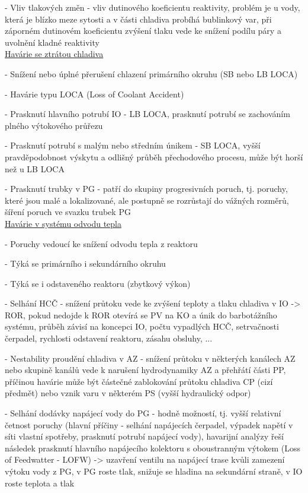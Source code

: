 \noindent - 	Vliv tlakových změn - vliv dutinového koeficientu reaktivity, problém je u vody, která je blízko meze sytosti a v části chladiva probíhá bublinkový var, při záporném dutinovém koeficientu zvýšení tlaku vede ke snížení podílu páry a uvolnění kladné reaktivity
\\

\underline{Havárie se ztrátou chladiva}

\noindent - 	Snížení nebo úplné přerušení chlazení primárního okruhu (SB nebo LB LOCA)

\noindent - 	Havárie typu LOCA (Loss of Coolant Accident)

\noindent - 	Prasknutí hlavního potrubí IO - LB LOCA, prasknutí potrubí se zachováním plného výtokového průřezu

\noindent - 	Prasknutí potrubí s malým nebo středním únikem - SB LOCA, vyšší pravděpodobnost výskytu a odlišný průběh přechodového procesu, může být horší než u LB LOCA

\noindent - 	Prasknutí trubky v PG - patří do skupiny progresivních poruch, tj. poruchy, které jsou malé a lokalizované, ale postupně se rozrůstají do vážných rozměrů, šíření poruch ve svazku trubek PG
\\

\underline{Havárie v systému odvodu tepla}

\noindent - 	Poruchy vedoucí ke snížení odvodu tepla z reaktoru

\noindent - 	Týká se primárního i sekundárního okruhu

\noindent - 	Týká se i odstaveného reaktoru (zbytkový výkon)

\noindent - 	Selhání HCČ - snížení průtoku vede ke zvýšení teploty a tlaku chladiva v IO -> ROR, pokud nedojde k ROR otevírá se PV na KO a únik do barbotážního systému, průběh závisí na koncepci IO, počtu vypadlých HCČ, setrvačnosti čerpadel, rychlosti odstavení reaktoru, zásahu obsluhy, ...

\noindent - 	Nestability proudění chladiva v AZ - snížení průtoku v některých kanálech AZ nebo skupině kanálů vede k narušení hydrodynamiky AZ a přehřátí části PP, příčinou havárie může být částečné zablokování průtoku chladiva CP (cizí předmět) nebo vznik varu v některém PS (vyšší hydraulický odpor)

\noindent - 	Selhání dodávky napájecí vody do PG - hodně možností, tj. vyšší relativní četnost poruchy (hlavní příčiny - selhání napájecích čerpadel, výpadek napětí v síti vlastní spotřeby, prasknutí potrubí napájecí vody), havarijní analýzy řeší následek prasknutí hlavního napájecího kolektoru s oboustranným výtokem (Loss of Feedwatter - LOFW) -> uzavření ventilu na napájecí trase kvůli zamezení výtoku vody z PG, v PG roste tlak, snižuje se hladina na sekundární straně, v IO roste teplota a tlak

